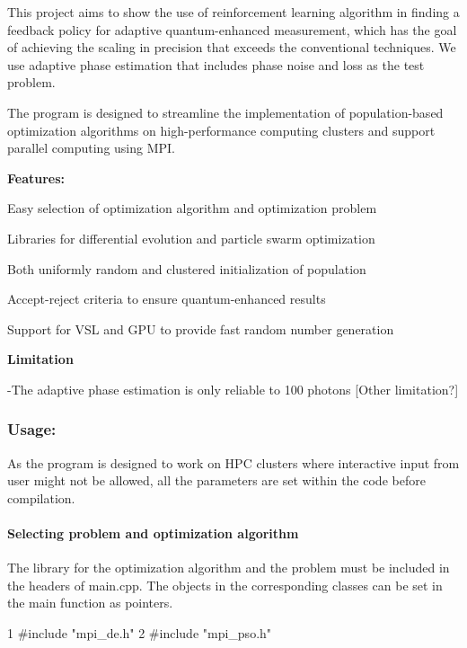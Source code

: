 This project aims to show the use of reinforcement learning algorithm in finding a feedback policy for adaptive quantum-\/enhanced measurement, which has the goal of achieving the scaling in precision that exceeds the conventional techniques. We use adaptive phase estimation that includes phase noise and loss as the test problem.

The program is designed to streamline the implementation of population-\/based optimization algorithms on high-\/performance computing clusters and support parallel computing using M\+P\+I.

{\bfseries Features\+:}


\begin{DoxyItemize}
\item Easy selection of optimization algorithm and optimization problem
\item Libraries for differential evolution and particle swarm optimization
\item Both uniformly random and clustered initialization of population
\item Accept-\/reject criteria to ensure quantum-\/enhanced results
\item Support for V\+S\+L and G\+P\+U to provide fast random number generation
\end{DoxyItemize}

{\bfseries Limitation}

-\/\+The adaptive phase estimation is only reliable to 100 photons \mbox{[}Other limitation?\mbox{]}

\subsubsection*{Usage\+:}

As the program is designed to work on H\+P\+C clusters where interactive input from user might not be allowed, all the parameters are set within the code before compilation.

\paragraph*{Selecting problem and optimization algorithm}

The library for the optimization algorithm and the problem must be included in the headers of main.\+cpp. The objects in the corresponding classes can be set in the main function as pointers.


\begin{DoxyCode}
1 #include "mpi\_de.h"
2 #include "mpi\_pso.h"
\end{DoxyCode}


